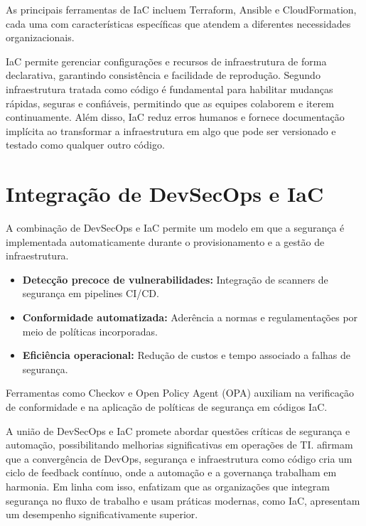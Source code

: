 As principais ferramentas de IaC incluem Terraform, Ansible e CloudFormation, cada uma com características específicas que atendem a diferentes necessidades organizacionais.

IaC permite gerenciar configurações e recursos de infraestrutura de forma declarativa, garantindo consistência e facilidade de reprodução. Segundo  infraestrutura tratada como código é fundamental para habilitar mudanças rápidas, seguras e confiáveis, permitindo que as equipes colaborem e iterem continuamente. Além disso, IaC reduz erros humanos e fornece documentação implícita ao transformar a infraestrutura em algo que pode ser versionado e testado como qualquer outro código\cite{brikman2022terraform}.


\section{Integração de DevSecOps e IaC}
A combinação de DevSecOps e IaC permite um modelo em que a segurança é implementada automaticamente durante o provisionamento e a gestão de infraestrutura.

\begin{itemize}
    \item\textbf{Detecção precoce de vulnerabilidades:} Integração de scanners de segurança em pipelines CI/CD.
    \item\textbf{Conformidade automatizada:} Aderência a normas e regulamentações por meio de políticas incorporadas.
    \item\textbf{Eficiência operacional:} Redução de custos e tempo associado a falhas de segurança.
\end{itemize}

Ferramentas como Checkov e Open Policy Agent (OPA) auxiliam na verificação de conformidade e na aplicação de políticas de segurança em códigos IaC.

 A união de DevSecOps e IaC promete abordar questões críticas de segurança e automação, possibilitando melhorias significativas em operações de TI.  afirmam que a convergência de DevOps, segurança e infraestrutura como código cria um ciclo de feedback contínuo, onde a automação e a governança trabalham em harmonia. Em linha com isso,  enfatizam que as organizações que integram segurança no fluxo de trabalho e usam práticas modernas, como IaC, apresentam um desempenho significativamente superior.